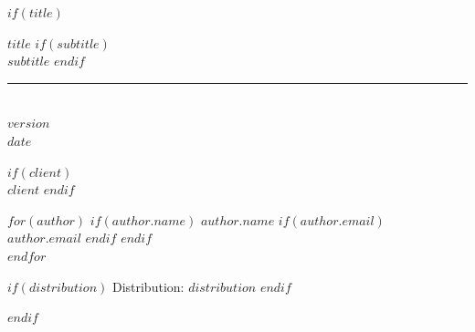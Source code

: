 \documentclass[10pt, letterpaper, titlepage, oneside, openright, final, article]{memoir}
\begin{document}
%
$if(title)$
    \ifpdf
    \fi
    \newlength{\centeroffset}
    \thispagestyle{empty}
    \vspace*{2.0in}
    \begin{flushleft}
        {
            {\fontsize{20.28pt}{22pt}$title$}
            $if(subtitle)$
                {\\\fontsize{18.28pt}{22pt}$subtitle$}
            $endif$
        }
        \noindent\rule[-1ex]{\textwidth}{1pt}\\[2.8ex]

        {\fontsize{12pt}{22pt}$version$}\\[0.05in]
        {\fontsize{12pt}{22pt}$date$}

        $if(client)$
            \\[0.05in]
            {\fontsize{14pt}{22pt}$client$}
        $endif$

        \vspace*{\fill}

        $for(author)$
            $if(author.name)$
                {\fontsize{13pt}{15pt}$author.name$}
                $if(author.email)$
                    {\\[0.05in]\fontsize{12pt}{14pt}$author.email$}
                $endif$
            $endif$
            \\[0.2in]
        $endfor$

        \vspace*{0.5in}

        $if(distribution)$
            {\fontsize{12pt}{14pt}Distribution: $distribution$}
        $endif$
    \end{flushleft}
$endif$
\end{document}
